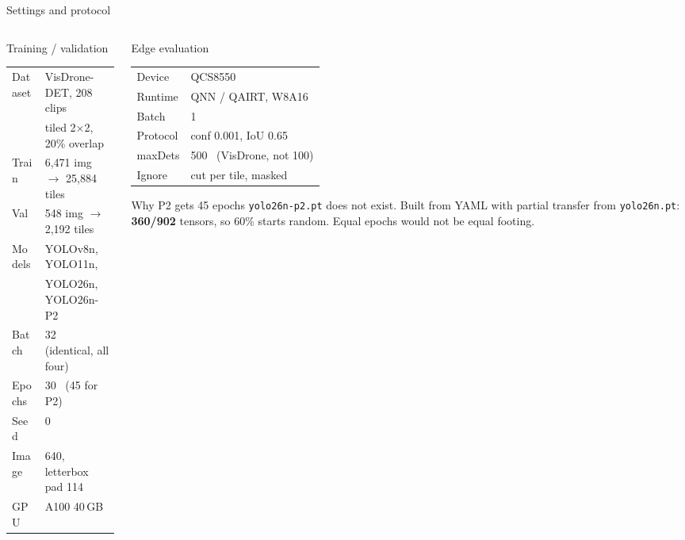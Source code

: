 \begin{frame}{Settings and protocol}
  \begin{columns}[T,onlytextwidth]
    \begin{column}{0.5\textwidth}
      \begin{block}{Training / validation}
        \small
        \begin{tabular}{@{}ll@{}}
          Dataset   & VisDrone-DET, 208 clips \\
                    & tiled 2$\times$2, 20\% overlap \\
          Train     & 6{,}471 img $\rightarrow$ 25{,}884 tiles \\
          Val       & 548 img $\rightarrow$ 2{,}192 tiles \\
          Models    & YOLOv8n, YOLO11n, \\
                    & YOLO26n, YOLO26n-P2 \\
          Batch     & 32 \, (identical, all four) \\
          Epochs    & 30 \, (45 for P2) \\
          Seed      & 0 \\
          Image     & 640, letterbox pad 114 \\
          GPU       & A100 40\,GB \\
        \end{tabular}
      \end{block}
    \end{column}
    \begin{column}{0.46\textwidth}
      \begin{block}{Edge evaluation}
        \small
        \begin{tabular}{@{}ll@{}}
          Device    & QCS8550 \\
          Runtime   & QNN / QAIRT, W8A16 \\
          Batch     & 1 \\
          Protocol  & conf 0.001, IoU 0.65 \\
          maxDets   & 500 \, (VisDrone, not 100) \\
          Ignore    & cut per tile, masked \\
        \end{tabular}
      \end{block}
      \begin{alertblock}{Why P2 gets 45 epochs}
        \small
        \texttt{yolo26n-p2.pt} does not exist. Built from YAML with partial
        transfer from \texttt{yolo26n.pt}: \textbf{360/902} tensors, so 60\%
        starts random. Equal epochs would not be equal footing.
      \end{alertblock}
    \end{column}
  \end{columns}
\end{frame}

